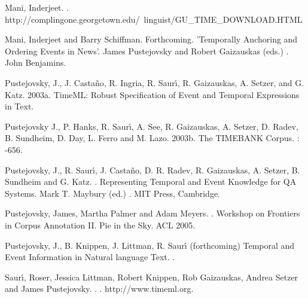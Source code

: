 \documentclass[12pt]{article}
\begin{document}
\begin{thebibliography}{}


\vspace{2mm}
Mani, Inderjeet.
.
\newblock http://complingone.georgetown.edu/~linguist/GU\_TIME\_DOWNLOAD.HTML

Mani, Inderjeet and Barry Schiffman.
\newblock Forthcoming.
\newblock 'Temporally Anchoring and Ordering Events in News'.
\newblock  James Pustejovsky and Robert Gaizauskas (eds.)
.
\newblock John Benjamins.

Pustejovsky, J., J. Casta\~{n}o, R. Ingria, R. Saur\'{\i}, R. Gaizauskas, A. Setzer, and G. Katz.
\newblock 2003a.
\newblock TimeML: Robust Specification of Event and Temporal Expressions in Text.

Pustejovsky J., P. Hanks, R. Saur\'{\i}, A. See, R. Gaizauskas, A. Setzer, D. Radev, B. Sundheim, D. Day, L. Ferro and M. Lazo.
\newblock 2003b.
\newblock The TIMEBANK Corpus.
:
-656.

Pustejovsky, J.,  R. Saur\'{\i}, J. Casta\~{n}o, D. R. Radev, R. Gaizauskas, A. Setzer, B. Sundheim and G. Katz.
.
\newblock Representing Temporal and Event Knowledge for QA Systems.
\newblock Mark T. Maybury (ed.)
.
\newblock MIT Press, Cambridge.

Pustejovsky, James, Martha Palmer and Adam Meyers.
.
\newblock
\newblock Workshop on Frontiers in Corpus Annotation II. Pie in the Sky. ACL 2005.

Pustejovsky, J., B. Knippen, J. Littman, R. Saur\'{\i}
\newblock (forthcoming)
\newblock Temporal and Event Information in Natural language Text.
.

Saur\'{\i}, Roser, Jessica Littman, Robert Knippen, Rob Gaizauskas, Andrea Setzer and James Pustejovsky.
.
.
\newblock http://www.timeml.org.


\end{thebibliography}
\end{document}
